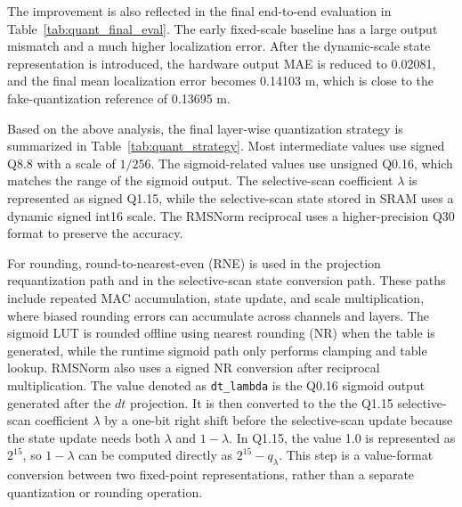 \documentclass[11pt,twoside]{eitExjobb}
\begin{document}
The improvement is also reflected in the final end-to-end evaluation in
Table~\ref{tab:quant_final_eval}. The early fixed-scale baseline has a
large output mismatch and a much higher localization error. After the dynamic-scale
state representation is introduced, the hardware output MAE is reduced to 0.02081,
and the final mean localization error becomes 0.14103 m, which is close to the
fake-quantization reference of 0.13695 m.

\begin{table}[H]
\centering
\caption{End-to-end quantization evaluation.}
\label{tab:quant_final_eval}
\small
\setlength{\tabcolsep}{6pt}
\end{table}

Based on the above analysis, the final layer-wise quantization strategy is summarized
in Table~\ref{tab:quant_strategy}. Most intermediate values use signed Q8.8 with a
scale of \(1/256\). The sigmoid-related values use unsigned Q0.16, which matches the
range of the sigmoid output. The selective-scan coefficient \(\lambda\) is represented
as signed Q1.15, while the selective-scan state stored in SRAM uses a dynamic signed
int16 scale. The RMSNorm reciprocal uses a higher-precision Q30 format to preserve 
the accuracy.

For rounding, round-to-nearest-even (RNE) is used in the projection requantization
path and in the selective-scan state conversion path. These paths include repeated MAC
accumulation, state update, and scale multiplication, where biased rounding errors can
accumulate across channels and layers. The sigmoid LUT is rounded offline using nearest
rounding (NR) when the table is generated, while the runtime sigmoid path only performs
clamping and table lookup. RMSNorm also uses a signed NR conversion after reciprocal
multiplication. The value denoted as \texttt{dt\_lambda} is the Q0.16 sigmoid output
generated after the \(dt\) projection. It is then converted to the the Q1.15 
selective-scan coefficient \(\lambda\) by a one-bit right shift before the 
selective-scan update because the state update needs both \(\lambda\) and \(1-\lambda\). 
In Q1.15, the value 1.0 is represented as \(2^{15}\), so \(1-\lambda\) can 
be computed directly as \(2^{15}-q_{\lambda}\). This step is a value-format
conversion between two fixed-point representations, rather than a separate
quantization or rounding operation.
\end{document}
